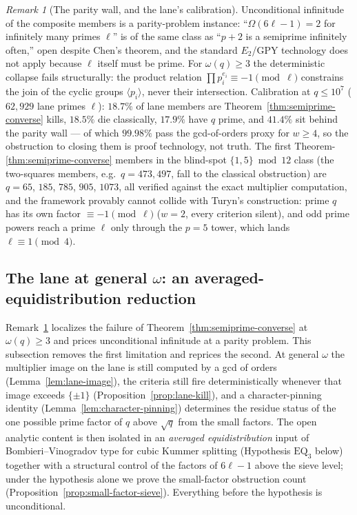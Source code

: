 \documentclass[11pt]{article}
\theoremstyle{plain}
\theoremstyle{definition}
\theoremstyle{remark}
\newtheorem{remark}[theorem]{Remark}
\begin{document}
\begin{remark}[The parity wall, and the lane's calibration]
\label{rem:parity-wall}
Unconditional infinitude of the composite members is a parity-problem
instance: ``$\Omega(6\ell-1)=2$ for infinitely many primes $\ell$'' is
of the same class as ``$p+2$ is a semiprime infinitely often,'' open
despite Chen's theorem, and the standard $E_2$/GPY technology does not
apply because $\ell$ itself must be prime.  For $\omega(q)\ge3$ the
deterministic collapse fails structurally: the product relation
$\prod p_i^{e_i}\equiv-1\pmod\ell$ constrains the join of the cyclic
groups $\langle p_i\rangle$, never their intersection.  Calibration at
$q\le10^7$ ($62{,}929$ lane primes $\ell$): $18.7\%$ of lane members
are Theorem~\ref{thm:semiprime-converse} kills, $18.5\%$ die
classically, $17.9\%$ have $q$ prime, and $41.4\%$ sit behind the
parity wall --- of which $99.98\%$ pass the gcd-of-orders proxy for
$w\ge4$, so the obstruction to closing them is proof technology, not
truth.  The first Theorem-\ref{thm:semiprime-converse} members in the blind-spot
$\{1,5\}\bmod12$ class (the two-squares members, e.g.\ $q=473,497$, fall to
the classical obstruction) are $q=65$, $185$, $785$, $905$, $1073$, all
verified against the exact
multiplier computation, and the framework provably cannot collide with
Turyn's construction: prime $q$ has its own factor $\equiv-1\pmod\ell$
($w=2$, every criterion silent), and odd prime powers reach a prime
$\ell$ only through the $p=5$ tower, which lands $\ell\equiv1\pmod4$.
\end{remark}

\subsection{The lane at general \texorpdfstring{$\omega$}{omega}: an
averaged-equidistribution reduction}\label{sec:lane-density}

Remark~\ref{rem:parity-wall} localizes the failure of
Theorem~\ref{thm:semiprime-converse} at $\omega(q)\ge3$ and prices
unconditional infinitude at a parity problem.  This subsection removes
the first limitation and reprices the second.  At general $\omega$ the
multiplier image on the lane is still computed by a gcd of orders
(Lemma~\ref{lem:lane-image}), the criteria still fire deterministically
whenever that image exceeds $\{\pm1\}$
(Proposition~\ref{prop:lane-kill}), and a character-pinning identity
(Lemma~\ref{lem:character-pinning}) determines the residue status of the
one possible prime factor of $q$ above $\sqrt q$ from the small factors.
The open analytic content is then isolated in an \emph{averaged
equidistribution} input of Bombieri--Vinogradov type for cubic Kummer
splitting (Hypothesis $\mathrm{EQ}_3$ below) together with a structural
control of the factors of $6\ell-1$ above the sieve level; under the
hypothesis alone we prove the small-factor obstruction count
(Proposition~\ref{prop:small-factor-sieve}).  Everything before the
hypothesis is unconditional.
\end{document}
